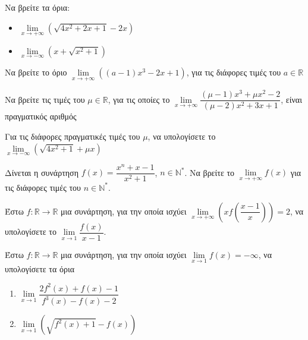 \documentclass{presentation}
\begin{document}
\begin{askisi}
  Να βρείτε τα όρια:
  \begin{itemize}
    \item $\lim\limits_{x \to +\infty}{ \left( \sqrt{4x^2+2x+1}-2x \right)  }$ \pause
    \item $\lim\limits_{x \to -\infty}{ \left( x+ \sqrt{x^2+1} \right)  }$
  \end{itemize}
\end{askisi}

\begin{askisi}
  Να βρείτε το όριο $\lim\limits_{x \to +\infty}{ \left( (a-1)x^3-2x+1 \right)  }$, για τις διάφορες τιμές του $a\in\mathbb{R}$
\end{askisi}

\begin{askisi}
  Να βρείτε τις τιμές του $μ\in\mathbb{R}$, για τις οποίες το $\lim\limits_{x \to +\infty}{ \dfrac{(μ-1)x^3+μx^2-2}{(μ-2)x^2+3x+1}  }$, είναι πραγματικός αριθμός
\end{askisi}

\begin{askisi}
  Για τις διάφορες πραγματικές τιμές του $μ$, να υπολογίσετε το $\lim\limits_{x \to -\infty}{ \left( \sqrt{4x^2+1}+μx \right)  }$
\end{askisi}

\begin{askisi}
  Δίνεται η συνάρτηση $f(x)=\dfrac{x^n+x-1}{x^2+1}$, $n\in\mathbb{N}^*$. Να βρείτε το $\lim\limits_{x \to +\infty}{ f(x) } $ για τις διάφορες τιμές του $n\in\mathbb{N}^*$.
\end{askisi}

\begin{askisi}
  Έστω $f:\mathbb{R}\to\mathbb{R}$ μια συνάρτηση, για την οποία ισχύει $\lim\limits_{x \to +\infty}{ \left( xf\left( \dfrac{x-1}{x} \right)  \right)  }=2$, να υπολογίσετε το $\lim\limits_{x \to 1}{ \dfrac{f(x)}{x-1} }$.
\end{askisi}

\begin{askisi}
  Έστω $f:\mathbb{R}\to\mathbb{R}$ μια συνάρτηση, για την οποία ισχύει $\lim\limits_{x \to 1}{ f(x)  }=-\infty$, να υπολογίσετε τα όρια
  \begin{enumerate}
    \item $\lim\limits_{x \to 1}{ \dfrac{2f^2(x)+f(x)-1}{f^3(x)-f(x)-2} }$ \pause
    \item $\lim\limits_{x \to 1}{ \left( \sqrt{f^2(x)+1}-f(x) \right)  }$
  \end{enumerate}
\end{askisi}
\end{document}
